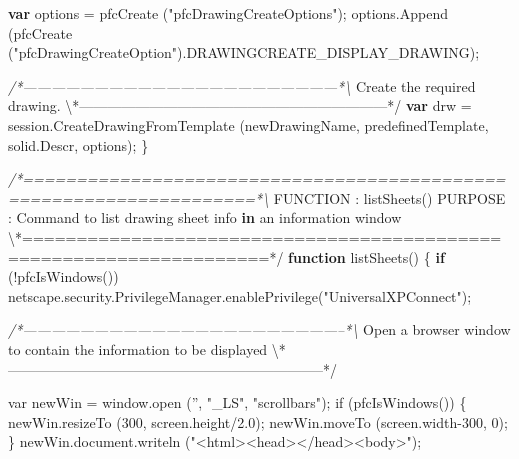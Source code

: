 \documentclass[]{article}
\newenvironment{Shaded}{}{}
\newcommand{\KeywordTok}[1]{\textcolor[rgb]{0.00,0.44,0.13}{\textbf{{#1}}}}
\newcommand{\DecValTok}[1]{\textcolor[rgb]{0.25,0.63,0.44}{{#1}}}
\newcommand{\FloatTok}[1]{\textcolor[rgb]{0.25,0.63,0.44}{{#1}}}
\newcommand{\StringTok}[1]{\textcolor[rgb]{0.25,0.44,0.63}{{#1}}}
\newcommand{\CommentTok}[1]{\textcolor[rgb]{0.38,0.63,0.69}{\textit{{#1}}}}
\newcommand{\OtherTok}[1]{\textcolor[rgb]{0.00,0.44,0.13}{{#1}}}
\newcommand{\FunctionTok}[1]{\textcolor[rgb]{0.02,0.16,0.49}{{#1}}}
\newcommand{\NormalTok}[1]{{#1}}
\begin{document}
\begin{Shaded}
\begin{Highlighting}[]
  \KeywordTok{var} \NormalTok{options = }\FunctionTok{pfcCreate} \NormalTok{(}\StringTok{"pfcDrawingCreateOptions"}\NormalTok{);}
  \OtherTok{options}\NormalTok{.}\FunctionTok{Append} \NormalTok{(}\FunctionTok{pfcCreate} \NormalTok{(}\StringTok{"pfcDrawingCreateOption"}\NormalTok{).}\FunctionTok{DRAWINGCREATE_DISPLAY_DRAWING}\NormalTok{);}
  
\CommentTok{/*------------------------------------------------------------------*\textbackslash{}}
  \NormalTok{Create the required }\OtherTok{drawing}\NormalTok{.}
\NormalTok{\textbackslash{}*------------------------------------------------------------------*}\OtherTok{/}
  \KeywordTok{var} \NormalTok{drw = }\OtherTok{session}\NormalTok{.}\FunctionTok{CreateDrawingFromTemplate}  \NormalTok{(newDrawingName, }
                        \NormalTok{predefinedTemplate,}
                        \OtherTok{solid}\NormalTok{.}\FunctionTok{Descr}\NormalTok{, options);}
\NormalTok{\}}


\CommentTok{/*====================================================================*\textbackslash{}}
\NormalTok{FUNCTION : }\FunctionTok{listSheets}\NormalTok{() }
\NormalTok{PURPOSE  : Command to list drawing sheet info }\KeywordTok{in} \NormalTok{an information window}
\NormalTok{\textbackslash{}*====================================================================*}\OtherTok{/}
\KeywordTok{function} \FunctionTok{listSheets}\NormalTok{()}
\NormalTok{\{ }
  \KeywordTok{if} \NormalTok{(!}\FunctionTok{pfcIsWindows}\NormalTok{())}
    \OtherTok{netscape}\NormalTok{.}\OtherTok{security}\NormalTok{.}\OtherTok{PrivilegeManager}\NormalTok{.}\FunctionTok{enablePrivilege}\NormalTok{(}\StringTok{"UniversalXPConnect"}\NormalTok{);  }

\CommentTok{/*--------------------------------------------------------------------*\textbackslash{}}
  \NormalTok{Open a browser window to contain the information to be displayed}
\NormalTok{\textbackslash{}*--------------------------------------------------------------------*}\OtherTok{/ }

\OtherTok{  var newWin = window.open }\FloatTok{(}\OtherTok{'', "_LS", "scrollbars"}\FloatTok{)}\OtherTok{;}
\OtherTok{  if }\FloatTok{(}\OtherTok{pfcIsWindows}\FloatTok{())}
\OtherTok{    \{}
\OtherTok{      newWin.resizeTo }\FloatTok{(}\OtherTok{300, screen.height/2}\FloatTok{.0}\NormalTok{);}
      \OtherTok{newWin}\NormalTok{.}\FunctionTok{moveTo} \NormalTok{(}\OtherTok{screen}\NormalTok{.}\FunctionTok{width}\DecValTok{-300}\NormalTok{, }\DecValTok{0}\NormalTok{);}
    \NormalTok{\}}
  \OtherTok{newWin}\NormalTok{.}\OtherTok{document}\NormalTok{.}\FunctionTok{writeln} \NormalTok{(}\StringTok{"<html><head></head><body>"}\NormalTok{);}
   

\end{Highlighting}
\end{Shaded}
\end{document}
